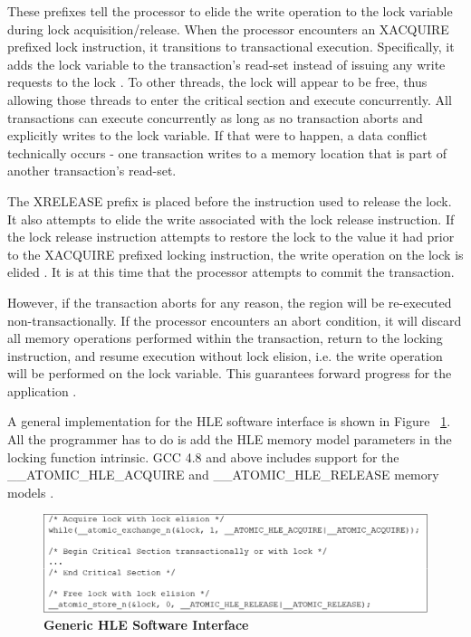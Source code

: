 \documentclass[11pt]{book}
\begin{document}
These prefixes tell the processor to elide the write operation to the lock variable during
lock acquisition/release.  When the processor encounters an XACQUIRE prefixed lock
instruction, it transitions to transactional execution.  Specifically, it adds the lock
variable to the transaction's read-set instead of issuing any write requests to the lock
\cite{intel_prog_ref}.  To other threads, the lock will appear to be free, thus allowing
those threads to enter the critical section and execute concurrently.  All transactions
can execute concurrently as long as no transaction aborts and explicitly writes to the
lock variable.  If that were to happen, a data conflict technically occurs - one
transaction writes to a memory location that is part of another transaction's read-set.

The XRELEASE prefix is placed before the instruction used to release the lock.  It also
attempts to elide the write associated with the lock release instruction.  If the lock
release instruction attempts to restore the lock to the value it had prior to the XACQUIRE
prefixed locking instruction, the write operation on the lock is elided
\cite{intel_prog_ref}.  It is at this time that the processor attempts to commit the
transaction.

However, if the transaction aborts for any reason, the region will be re-executed
non-transactionally.  If the processor encounters an abort condition, it will discard all
memory operations performed within the transaction, return to the locking instruction, and
resume execution without lock elision, i.e. the write operation will be performed on the
lock variable.  This guarantees forward progress for the application
\cite{intel_prog_ref}.

A general implementation for the HLE software interface is shown in Figure
~\ref{fig:hle_interface}.  All the programmer has to do is add the HLE memory model
parameters in the locking function intrinsic.  GCC 4.8 and above includes support for the
\_\_ATOMIC\_HLE\_ACQUIRE and \_\_ATOMIC\_HLE\_RELEASE memory models \cite{gcc}.

\begin{figure}[H]
    \centering
    \graphicspath{ {./figures/} }
    \includegraphics[width=\textwidth,height=\textheight,keepaspectratio]{fig_hleInterface}
    \caption{\textbf{Generic HLE Software Interface}}
    \label{fig:hle_interface}
\end{figure}
\end{document}
